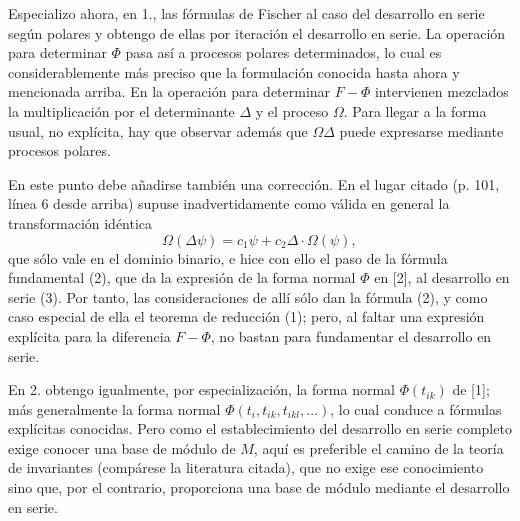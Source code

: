 \documentclass[11pt]{article}
\begin{document}
Especializo ahora, en 1., las fórmulas de Fischer al caso del desarrollo en serie según polares y obtengo de ellas por iteración el desarrollo en serie. La operación para determinar \(\Phi\) pasa así a procesos polares determinados, lo cual es considerablemente más preciso que la formulación conocida hasta ahora y mencionada arriba. En la operación para determinar \(F-\Phi\) intervienen mezclados la multiplicación por el determinante \(\Delta\) y el proceso \(\Omega\). Para llegar a la forma usual, no explícita, hay que observar además que \(\Omega\Delta\) puede expresarse mediante procesos polares.

En este punto debe añadirse también una corrección. En el lugar citado (p. 101, línea 6 desde arriba) supuse inadvertidamente como válida en general la transformación idéntica
\[
        \Omega(\Delta\psi)=c_1\psi+c_2\Delta\cdot\Omega(\psi),
\]
que sólo vale en el dominio binario, e hice con ello el paso de la fórmula fundamental (2), que da la expresión de la forma normal \(\Phi\) en [2], al desarrollo en serie (3). Por tanto, las consideraciones de allí sólo dan la fórmula (2), y como caso especial de ella el teorema de reducción (1); pero, al faltar una expresión explícita para la diferencia \(F-\Phi\), no bastan para fundamentar el desarrollo en serie.

En 2. obtengo igualmente, por especialización, la forma normal \(\Phi(t_{ik})\) de [1]; más generalmente la forma normal \(\Phi(t_i,t_{ik},t_{ikl},\ldots)\), lo cual conduce a fórmulas explícitas conocidas. Pero como el establecimiento del desarrollo en serie completo exige conocer una base de módulo de \(M\), aquí es preferible el camino de la teoría de invariantes (compárese la literatura citada), que no exige ese conocimiento sino que, por el contrario, proporciona una base de módulo mediante el desarrollo en serie.
\end{document}
